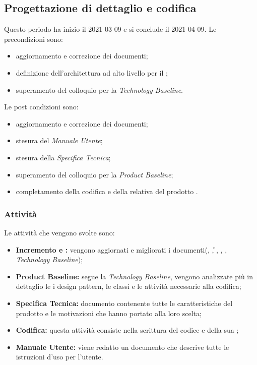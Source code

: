 \newpage
\subsection{Progettazione di dettaglio e codifica}
Questo periodo ha inizio il 2021-03-09 e si conclude il 2021-04-09.
Le precondizioni sono:
\begin{itemize}
	\item aggiornamento e correzione dei documenti;
	\item definizione dell'architettura ad alto livello per il ;
	\item  superamento del colloquio per la \textit{Technology Baseline}.
\end{itemize}
Le post condizioni sono:
\begin{itemize}
	\item aggiornamento e correzione dei documenti;
	\item stesura del \textit{Manuale Utente};
	\item stesura della \textit{Specifica Tecnica};
	\item superamento del colloquio per la \textit{Product Baseline};
	\item completamento della codifica e della relativa  del prodotto .
\end{itemize}
\subsubsection{Attività}
Le attività che vengono svolte sono:
\begin{itemize}
	\item \textbf{Incremento e :} vengono aggiornati e migliorati i documenti(\NdP{}, \PdP{}, \G{}, \PdQ{}, \AdR{}, \textit{Technology Baseline});
	\item \textbf{Product Baseline:} segue la \textit{Technology Baseline}, vengono analizzate più in dettaglio le  i design pattern, le classi e le attività necessarie alla codifica;
	\item \textbf{Specifica Tecnica:} documento contenente tutte le caratteristiche del prodotto e le motivazioni che hanno portato alla loro scelta;
	\item \textbf{Codifica:} questa attività consiste nella scrittura del codice e della sua ;
	\item \textbf{Manuale Utente:} viene redatto un documento che descrive tutte le istruzioni d'uso per l'utente.
\end{itemize}
